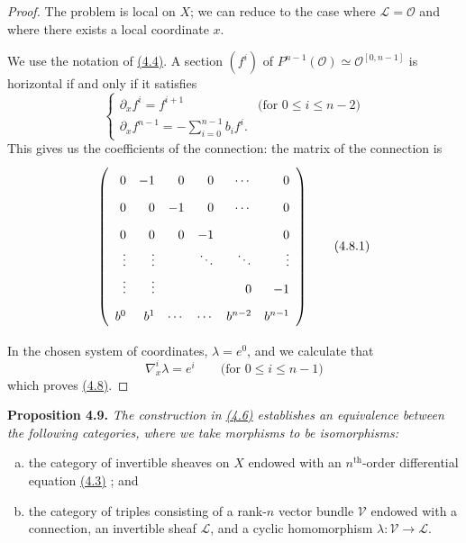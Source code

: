 \documentclass{report}
\newenvironment{itenv}[1]
  {\phantomsection\par\medskip\noindent\textbf{#1.}\itshape}
  {\par\medskip}
\newcommand{\scr}[1]{{\mathscr{#1}}}
\renewcommand{\cal}[1]{{\mathcal{#1}}}
\renewcommand{\leq}{\leqslant}
\newcommand{\oldpage}[1]{\marginpar{\footnotesize$\Big\vert$ \textit{p.~#1}}}
\begin{document}
\begin{proof}
  The problem is local on $X$;
  we can reduce to the case where $\scr{L}=\cal{O}$ and where there exists a local coordinate $x$.

  We use the notation of \hyperref[I.4.4]{(4.4)}.
  A section $(f^i)$ of $P^{n-1}(\cal{O})\simeq\cal{O}^{[0,n-1]}$ is horizontal if and only if it satisfies
  \[
    \begin{cases}
      \partial_x f^i = f^{i+1}
      & \mbox{(for $0\leq i\leq n-2$)}
    \\\partial_x f^{n-1} = -\sum_{i=0}^{n-1} b_i f^i.
    \end{cases}
  \]
  This gives us the coefficients of the connection: the matrix of the connection is
  \[
  \label{I.4.8.1}
    \left(
      \def\arraystretch{1.8}
      \begin{array}{rrrrrr}
        0 & -1 & 0 & 0 & \cdots & 0
      \\0 & 0 & -1 & 0 & \cdots & 0
      \\0 & 0 & 0 & -1 & & 0
      \\\vdots & \vdots & & \ddots & \ddots & \vdots
      \\\vdots & \vdots & & & 0 & -1
      \\b^0 & b^1 & \cdots & \cdots & b^{n-2} & b^{n-1}
      \end{array}
    \right)
  \tag{4.8.1}
  \]

\oldpage{27}
  In the chosen system of coordinates, $\lambda=e^0$, and we calculate that
  \[
    \nabla_x^i\lambda = e^i
    \qquad\mbox{(for $0\leq i\leq n-1$)}
  \]
  which proves \hyperref[I.4.8]{(4.8)}.
\end{proof}

\begin{itenv}{Proposition 4.9}
\label{I.4.9}
  The construction in \hyperref[I.4.6]{(4.6)} establishes an equivalence between the following categories, where we take morphisms to be isomorphisms:
  \begin{enumerate}[a)]
    \item the category of invertible sheaves on $X$ endowed with an $n^\mathrm{th}$-order differential equation \hyperref[I.4.3]{(4.3)} ; and
    \item the category of triples consisting of a rank-$n$ vector bundle $\cal{V}$ endowed with a connection, an invertible sheaf $\scr{L}$, and a cyclic homomorphism $\lambda\colon\cal{V}\to\scr{L}$.
  \end{enumerate}
\end{itenv}
\end{document}
